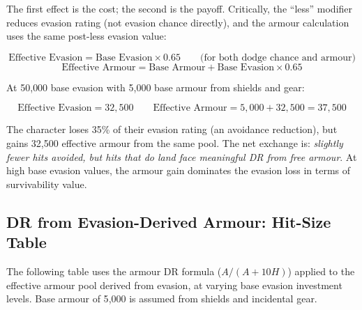 \documentclass[12pt, letterpaper]{article}
\begin{document}
The first effect is the cost; the second is the payoff. Critically, the ``less'' modifier reduces evasion rating (not evasion chance directly), and the armour calculation uses the same post-less evasion value:

\[
\text{Effective Evasion} = \text{Base Evasion} \times 0.65 \qquad \text{(for both dodge chance and armour)}
\]
\[
\text{Effective Armour} = \text{Base Armour} + \text{Base Evasion} \times 0.65
\]

At 50{,}000 base evasion with 5{,}000 base armour from shields and gear:

\[
\text{Effective Evasion} = 32{,}500 \qquad \text{Effective Armour} = 5{,}000 + 32{,}500 = 37{,}500
\]

The character loses 35\% of their evasion rating (an avoidance reduction), but gains 32{,}500 effective armour from the same pool. The net exchange is: \textit{slightly fewer hits avoided, but hits that do land face meaningful DR from free armour}. At high base evasion values, the armour gain dominates the evasion loss in terms of survivability value.

\subsection*{DR from Evasion-Derived Armour: Hit-Size Table}

The following table uses the armour DR formula ($A / (A + 10H)$) applied to the effective armour pool derived from evasion, at varying base evasion investment levels. Base armour of 5{,}000 is assumed from shields and incidental gear.
\end{document}
